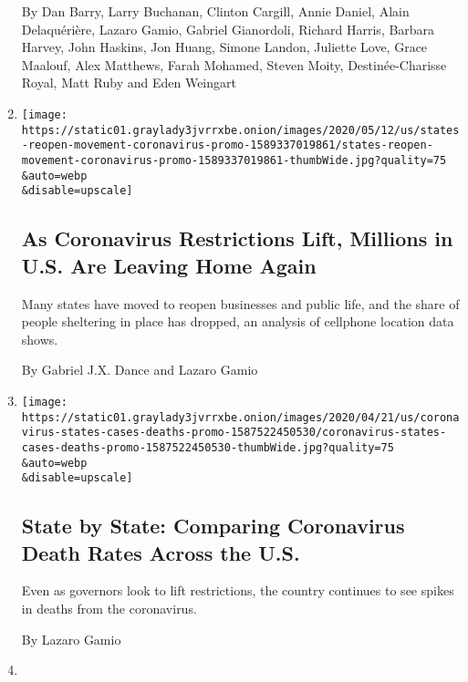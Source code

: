\begin{enumerate}
  By Dan Barry, Larry Buchanan, Clinton Cargill, Annie Daniel, Alain
  Delaquérière, Lazaro Gamio, Gabriel Gianordoli, Richard Harris,
  Barbara Harvey, John Haskins, Jon Huang, Simone Landon, Juliette Love,
  Grace Maalouf, Alex Matthews, Farah Mohamed, Steven Moity,
  Destinée-Charisse Royal, Matt Ruby and Eden Weingart
\item
  \href{/interactive/2020/05/12/us/coronavirus-reopening-shutdown.html}{}

  \texttt{[image: https://static01.graylady3jvrrxbe.onion/images/2020/05/12/us/states-reopen-movement-coronavirus-promo-1589337019861/states-reopen-movement-coronavirus-promo-1589337019861-thumbWide.jpg?quality=75\\\&auto=webp\\\&disable=upscale]}

  \hypertarget{as-coronavirus-restrictions-lift-millions-in-us-are-leaving-home-again}{%
  \subsection{As Coronavirus Restrictions Lift, Millions in U.S. Are
  Leaving Home
  Again}\label{as-coronavirus-restrictions-lift-millions-in-us-are-leaving-home-again}}

  Many states have moved to reopen businesses and public life, and the
  share of people sheltering in place has dropped, an analysis of
  cellphone location data shows.

  By Gabriel J.X. Dance and Lazaro Gamio
\item
  \href{/interactive/2020/04/22/us/coronavirus-death-rates.html}{}

  \texttt{[image: https://static01.graylady3jvrrxbe.onion/images/2020/04/21/us/coronavirus-states-cases-deaths-promo-1587522450530/coronavirus-states-cases-deaths-promo-1587522450530-thumbWide.jpg?quality=75\\\&auto=webp\\\&disable=upscale]}

  \hypertarget{state-by-state-comparing-coronavirus-death-rates-across-the-us}{%
  \subsection{State by State: Comparing Coronavirus Death Rates Across
  the
  U.S.}\label{state-by-state-comparing-coronavirus-death-rates-across-the-us}}

  Even as governors look to lift restrictions, the country continues to
  see spikes in deaths from the coronavirus.

  By Lazaro Gamio
\item
  \href{/interactive/2020/04/06/us/coronavirus-deaths-united-states.html}{}


\end{enumerate}
